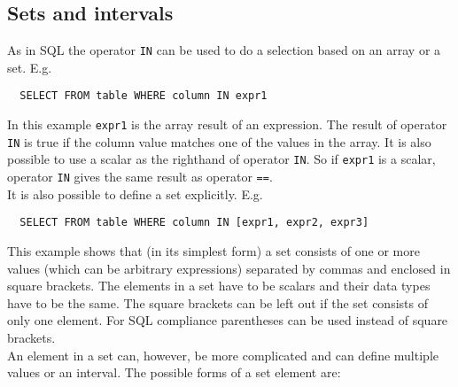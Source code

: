 \subsection{\label{TAQL:SETS}Sets and intervals}
As in SQL the operator \texttt{IN} can be used to do a selection
based on an array or a set. E.g.
\begin{verbatim}
  SELECT FROM table WHERE column IN expr1
\end{verbatim}
In this example \texttt{expr1} is the array result of an expression. The result
of operator \texttt{IN} is true if the column value matches one of the
values in the array. It is also possible to use a scalar as the
righthand of operator \texttt{IN}.
So if \texttt{expr1} is a scalar, operator \texttt{IN}
gives the same result as operator \texttt{==}.
\\It is also possible to define a set explicitly. E.g.
\begin{verbatim}
  SELECT FROM table WHERE column IN [expr1, expr2, expr3]
\end{verbatim}
This example shows that (in its simplest form) a set
consists of one or more values (which
can be arbitrary expressions) separated by commas and enclosed in
square brackets. The elements in a set have to be scalars and their
data types have to be the same. The square brackets can be left out if
the set consists of only one element. For SQL compliance
parentheses can be used instead of square brackets.
\\An element in a set can, however, be more complicated and can
define multiple values or an interval. The possible forms of
a set element are:
